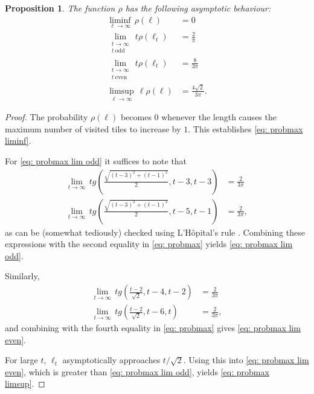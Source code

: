 \documentclass[12pt, a4paper]{article}
\newcommand{\probmax}{\rho} %
\newcommand{\len}{\ell} %
\newcommand{\tiles}{t} %
\newtheorem{proposition}{Proposition}%
\begin{document}
\begin{proposition}
The function $\probmax$ has the following asymptotic behaviour:
\begin{align}
\label{eq: probmax liminf}
\liminf_{\len \rightarrow \infty}\, \probmax(\len) & = 0 \\ 
\label{eq: probmax lim odd}
\lim_{\substack{\tiles \rightarrow \infty \\
\tiles \ \mathrm{odd}}}\, \tiles \probmax(\len_\tiles) & = \frac 2 \pi \\
\label{eq: probmax lim even}
\lim_{\substack{\tiles \rightarrow \infty \\ \tiles \ \mathrm{even}}}\, \tiles \probmax(\len_\tiles) & = \frac 8 {3\pi} \\
\label{eq: probmax limsup}
\limsup_{\len \rightarrow \infty}\, \len \probmax(\len) & = \frac {4\sqrt{2}}{3\pi}.
\end{align}
\end{proposition}

\begin{proof}
The probability $\probmax(\len)$ becomes $0$ whenever the length causes the maximum number of visited tiles to increase by $1$. This establishes \eqref{eq: probmax liminf}.

For \eqref{eq: probmax lim odd} it suffices to note that
\begin{align}
\label{eq: tedious limit, odd 1}
\lim_{\tiles \rightarrow \infty}\, \tiles g\left(\frac{\sqrt{(\tiles-3)^2+(\tiles-1)^2}} 2, \tiles-3, \tiles-3 \right) &= \frac 2 {3\pi} \\
\label{eq: tedious limit, odd 2}
\lim_{\tiles \rightarrow \infty}\, \tiles g\left(\frac{\sqrt{(\tiles-3)^2+(\tiles-1)^2}} 2, \tiles-5, \tiles-1 \right)
& = \frac 2 {3\pi},
\end{align}
as can be (somewhat tediously) checked using L'H\^opital's rule \cite[section~5.3]{Abbott15}.
Combining these expressions with the second equality in \eqref{eq: probmax} yields \eqref{eq: probmax lim odd}.

Similarly,
\begin{align}
\label{eq: tedious limit, even 1}
\lim_{\tiles \rightarrow \infty}\, \tiles g\left(\frac{\tiles-2}{\sqrt 2}, \tiles-4, \tiles-2 \right) &= \frac 2 {3\pi} \\
\label{eq: tedious limit, even 2}
\lim_{\tiles \rightarrow \infty}\, \tiles g\left(\frac{\tiles-2}{\sqrt 2}, \tiles-6, \tiles \right)
& = \frac 2 {3\pi},
\end{align}
and combining with the fourth equality in \eqref{eq: probmax} gives \eqref{eq: probmax lim even}.

For large $\tiles$, $\len_\tiles$ asymptotically approaches $\tiles/\sqrt{2}$. Using this into \eqref{eq: probmax lim even}, which is greater than \eqref{eq: probmax lim odd}, yields \eqref{eq: probmax limsup}.
\end{proof}




\end{document}
